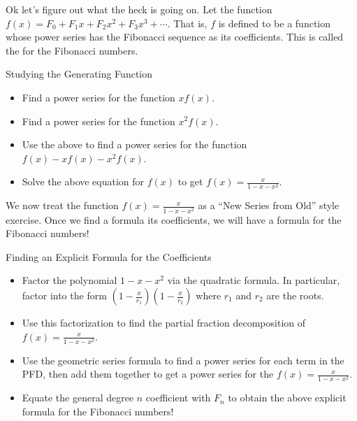 Ok let's figure out what the heck is going on.  Let the function $f(x)=F_0+F_1x+F_2x^2+F_3x^3+\cdots$.  That is, $f$ is defined to be a function whose power series has the Fibonacci sequence as its coefficients.  This is called the \emph{} for the Fibonacci numbers.
\begin{exercise}{Studying the Generating Function \Coffeecup \Coffeecup \Coffeecup}
\begin{itemize}

\item Find a power series for the function $xf(x)$.

\vspace*{.5in}

\item Find a power series for the function $x^2f(x)$.

\vspace*{.5in}
 
\item Use the above to find a power series for the function $f(x)-xf(x)-x^2f(x)$.  

\vspace*{1in}

\item Solve the above equation for $f(x)$ to get $f(x)=\frac{x}{1-x-x^2}$.

\vspace*{.5in}

\end{itemize}
\end{exercise}

We now treat the function $f(x)=\frac{x}{1-x-x^2}$ as a ``New Series from Old'' style exercise.  Once we find a formula its coefficients, we will have a formula for the Fibonacci numbers!

\begin{exercise}{Finding an Explicit Formula for the Coefficients \Coffeecup \Coffeecup \Coffeecup}
\begin{itemize}
\item Factor the polynomial $1-x-x^2$ via the quadratic formula.  In particular, factor into the form $\left(1-\frac{x}{r_1}\right)\left(1-\frac{x}{r_2}\right)$ where $r_1$ and $r_2$ are the roots.
\vspace*{1in}
\item Use this factorization to find the partial fraction decomposition of $f(x)=\frac{x}{1-x-x^2}$.
\vspace*{2in}
\item Use the geometric series formula to find a power series for each term in the PFD, then add them together to get a power series for the  $f(x)=\frac{x}{1-x-x^2}$. 
\vspace*{3in}
\item Equate the general degree $n$ coefficient with $F_n$ to obtain the above explicit formula for the Fibonacci numbers!
\vspace*{1in}
\end{itemize}
\end{exercise}

